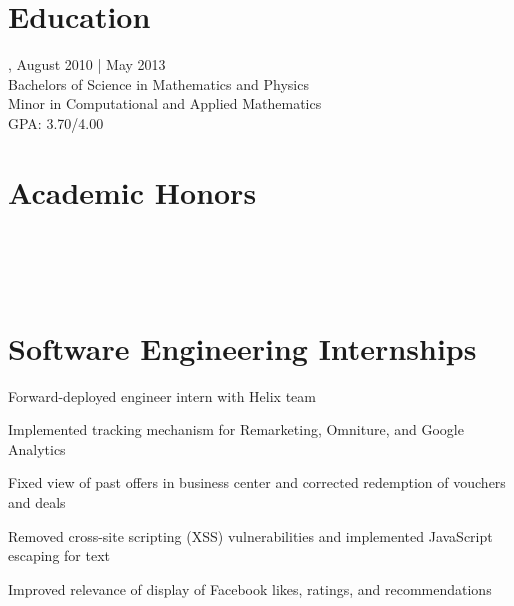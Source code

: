\documentclass{onkursen-resume}
\begin{document}
\begin{multicols}{2}
\section*{Education}
, August 2010 | May 2013\\
Bachelors of Science in Mathematics and Physics\\
Minor in Computational and Applied Mathematics\\
GPA: 3.70/4.00

\section*{Academic Honors}
\noindent
{}\\
\\
\\
\end{multicols}

\hr

\section*{Software Engineering Internships}

\begin{itemize*}
\item Forward-deployed engineer intern with Helix team
\end{itemize*}

\begin{itemize*}
\item Implemented tracking mechanism for Remarketing, Omniture, and Google Analytics
\item Fixed view of past offers in business center and corrected redemption of vouchers and deals
\end{itemize*}

\begin{itemize*}
\item Removed cross-site scripting (XSS) vulnerabilities and implemented JavaScript escaping for text
\item Improved relevance of display of Facebook likes, ratings, and recommendations
\end{itemize*}
\end{document}
